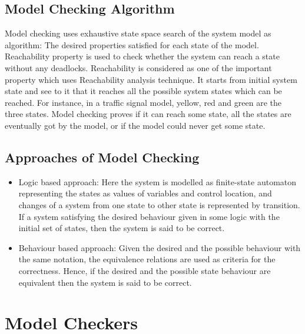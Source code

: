 \documentclass{article}
\begin{document}
\subsection{Model Checking Algorithm}
\label{sec:modcheckalg}

Model checking uses exhaustive state space search of the system model as  algorithm: The desired properties satisfied for each state of the model.  Reachability property is used to check whether the system can reach a state without any deadlocks. Reachability is considered as one of the important property which uses Reachability analysis technique. It starts from initial system state and see to it that it reaches all the possible system states which can be reached. For instance, in a traffic signal model, yellow, red and green are the three states. Model checking proves if it can reach some state, all the states are eventually got by the model, or if the model could never get some state.


\subsection{Approaches of Model Checking}
\label{sec:approchmodcheck}

\begin{itemize}
\item Logic based approach: Here the system is modelled as finite-state automaton representing the states as values of variables and control location, and changes of a system from one state to other state is represented by transition. If a system satisfying the desired behaviour given in some logic with the initial set of states, then the system is said to be correct.
\item Behaviour based approach: Given the desired and the possible behaviour with the same notation, the equivalence relations are used as criteria for the correctness. Hence, if the desired and the possible state behaviour are equivalent then the system is said to be correct.
\end{itemize}



\section{Model Checkers}
\label{sec:modelcheckers}
\end{document}
